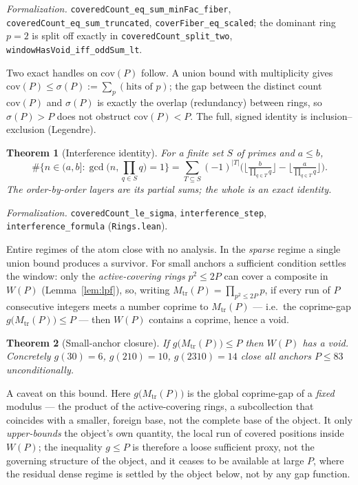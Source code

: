 \documentclass[11pt,a4paper]{amsart}
\theoremstyle{plain}
\newtheorem{theorem}{Theorem}[section]
\theoremstyle{definition}
\theoremstyle{plain}
\theoremstyle{remark}
\newcommand{\lean}[1]{\textup{\texttt{#1}}}
\newcommand{\Formal}[1]{\par\smallskip\noindent\emph{Formalization.} #1\par\smallskip}
\begin{document}
\Formal{\lean{coveredCount\_eq\_sum\_minFac\_fiber},
\lean{coveredCount\_eq\_sum\_truncated}, \lean{coverFiber\_eq\_scaled};
the dominant ring $p=2$ is split off exactly in \lean{coveredCount\_split\_two},
\lean{windowHasVoid\_iff\_oddSum\_lt}.}

Two exact handles on $\mathrm{cov}(P)$ follow. A union bound with multiplicity gives
$\mathrm{cov}(P)\le\sigma(P):=\sum_{p}(\text{hits of }p)$; the gap between the distinct
count $\mathrm{cov}(P)$ and $\sigma(P)$ is exactly the overlap (redundancy) between rings,
so $\sigma(P)>P$ does not obstruct $\mathrm{cov}(P)<P$. The full, signed identity is
inclusion--exclusion (Legendre).

\begin{theorem}[Interference identity]\label{thm:legendre}
For a finite set $S$ of primes and $a\le b$,
\[
\#\Big\{n\in(a,b]:\gcd\big(n,\textstyle\prod_{q\in S}q\big)=1\Big\}
=\sum_{T\subseteq S}(-1)^{|T|}
\Big(\big\lfloor\tfrac{b}{\prod_{q\in T}q}\big\rfloor
-\big\lfloor\tfrac{a}{\prod_{q\in T}q}\big\rfloor\Big).
\]
The order-by-order layers are its partial sums; the whole is an exact identity.
\end{theorem}

\Formal{\lean{coveredCount\_le\_sigma}, \lean{interference\_step},
\lean{interference\_formula} (\lean{Rings.lean}).}

Entire regimes of the atom close with no analysis. In the \emph{sparse} regime a single
union bound produces a survivor. For small anchors a sufficient condition settles the
window: only the \emph{active-covering rings} $p^2\le 2P$ can cover a composite in $W(P)$
(Lemma~\ref{lem:lpf}), so, writing $M_{\mathrm{tr}}(P)=\prod_{p^2\le 2P}p$, if every run of
$P$ consecutive integers meets a number coprime to $M_{\mathrm{tr}}(P)$ --- i.e.\ the
coprime-gap $g\big(M_{\mathrm{tr}}(P)\big)\le P$ --- then $W(P)$ contains a coprime, hence a
void.

\begin{theorem}[Small-anchor closure]\label{thm:jac}
If $g\big(M_{\mathrm{tr}}(P)\big)\le P$ then $W(P)$ has a void. Concretely $g(30)=6$,
$g(210)=10$, $g(2310)=14$ close all anchors $P\le 83$ unconditionally.
\end{theorem}

A caveat on this bound. Here $g\big(M_{\mathrm{tr}}(P)\big)$ is the global coprime-gap of a
\emph{fixed} modulus --- the product of the active-covering rings, a subcollection that
coincides with a smaller, foreign base, not the complete base of the object. It only
\emph{upper-bounds} the object's own quantity, the local run of covered positions inside
$W(P)$; the inequality $g\le P$ is therefore a loose sufficient proxy, not the governing
structure of the object, and it ceases to be available at large $P$, where the residual
dense regime is settled by the object below, not by any gap function.
\end{document}
